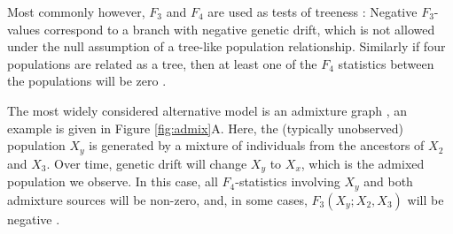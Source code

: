\documentclass[12pt,fullpage, a4paper]{article}
\begin{document}

Most commonly however, $F_3$ and $F_4$ are used as tests of treeness \citep{patterson2012}: Negative $F_3$-values correspond to a branch with negative genetic drift, which is not allowed under the null assumption of a tree-like population relationship. Similarly if four populations are related as a tree, then at least one of the $F_4$ statistics between the populations will be zero \citep{buneman1974, patterson2012}. 

The most widely considered alternative model is an admixture graph \citep{patterson2012}, an example is given in Figure \ref{fig:admix}A. Here, the (typically unobserved) population $X_y$ is generated by a mixture of individuals from the ancestors of $X_2$ and $X_3$. Over time, genetic drift will change $X_y$ to $X_x$, which is the admixed population we observe. In this case, all $F_4$-statistics involving $X_y$ and both admixture sources will be non-zero, and, in some cases, $F_3(X_y; X_2, X_3)$ will be negative \citep[exact conditions can be found in ][]{peter2016}. 
\end{document}
